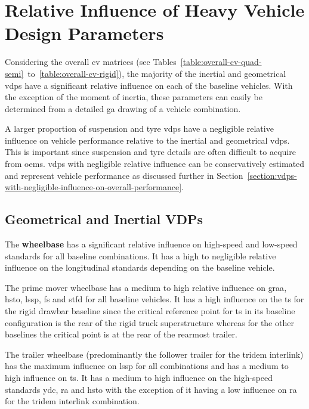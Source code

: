 \section{Relative Influence of Heavy Vehicle Design Parameters}\label{section:discussion-relative-influence-of-heavy-vehicle-design-parameters}

Considering the overall \gls{cv} matrices (see Tables~\ref{table:overall-cv-quad-semi}~to~\ref{table:overall-cv-rigid}), the majority of the inertial and geometrical \glspl{vdp} have a significant relative influence on each of the baseline vehicles. With the exception of the moment of inertia, these parameters can easily be determined from a detailed \gls{ga} drawing of a vehicle combination.

A larger proportion of suspension and tyre \glspl{vdp} have a negligible relative influence on vehicle performance relative to the inertial and geometrical \glspl{vdp}. This is important since suspension and tyre details are often difficult to acquire from \glspl{oem}. \glspl{vdp} with negligible relative influence can be conservatively estimated and represent vehicle performance as discussed further in Section~\ref{section:vdps-with-negligible-influence-on-overall-performance}.

\subsection{Geometrical and Inertial VDPs}\label{section:geometrical-and-inertial-vdps}

The \textbf{wheelbase} has a significant relative influence on high-speed and low-speed standards for all baseline combinations. It has a high to negligible relative influence on the longitudinal standards depending on the baseline vehicle.

The prime mover wheelbase has a medium to high relative influence on \gls{graa}, \gls{hsto}, \gls{lssp}, \gls{fs} and \gls{stfd} for all baseline vehicles. It has a high influence on the \gls{ts} for the rigid drawbar baseline since the critical reference point for \gls{ts} in its baseline configuration is the rear of the rigid truck superstructure whereas for the other baselines the critical point is at the rear of the rearmost trailer.

The trailer wheelbase (predominantly the follower trailer for the tridem interlink) has the maximum influence on \gls{lssp} for all combinations and has a medium to high influence on \gls{ts}. It has a medium to high influence on the high-speed standards \gls{ydc}, \gls{ra} and \gls{hsto} with the exception of it having a low influence on \gls{ra} for the tridem interlink combination.

